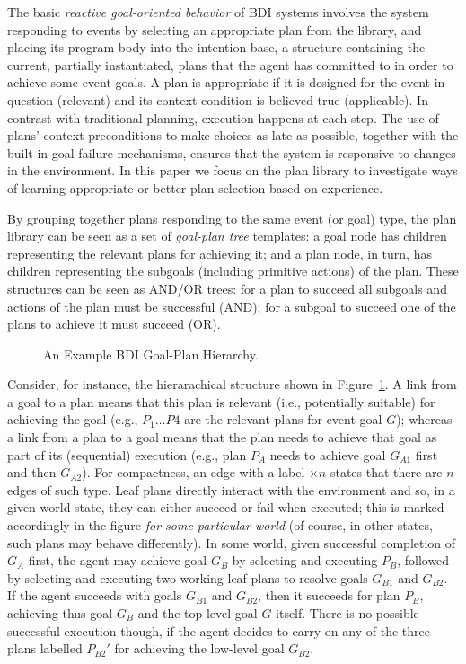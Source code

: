 The basic \emph{reactive goal-oriented behavior} of BDI systems involves the
system responding to events by selecting an appropriate plan from the library,
and placing its program body into the intention base, a structure containing the
current, partially instantiated, plans that the agent has committed to in order
to achieve some event-goals.
A plan is appropriate if it is designed for the event in question (relevant) and
its context condition is believed true (applicable).
In contrast with traditional planning, execution happens at each step. The use of
plans' context-preconditions to make choices as late as possible, together with
the built-in goal-failure mechanisms, ensures that the system is responsive to
changes in the environment.
In this paper we focus on the plan library to investigate ways of learning
appropriate or better plan selection based on experience.

By grouping together plans responding to the same
event (or goal) type, the plan library can be seen as a set of \emph{goal-plan tree}
templates: a goal node has children representing the
relevant plans for achieving it; and a plan node, in turn, has children
representing the subgoals (including primitive actions) of the plan.
These structures can be seen as AND/OR trees: for a plan to succeed all
subgoals and actions of the plan must be successful (AND); for a subgoal to
succeed one of the plans to achieve it must succeed (OR).

\begin{figure}[t]
\begin{center}
\resizebox{.6\textwidth}{!}{}
\end{center}
\vskip -0.5cm
\caption{An Example BDI Goal-Plan Hierarchy.}
\label{fig:T3}
\end{figure}

Consider, for instance, the hierarachical structure shown in Figure~\ref{fig:T3}.
A link from a goal to a plan means that this plan is relevant (i.e., potentially
suitable) for achieving the goal (e.g., $P_1 \ldots P4$ are the relevant plans
for event goal $G$); whereas a link from a plan to a goal means that the plan
needs to achieve that goal as part of its (sequential) execution (e.g., plan
$P_A$ needs to achieve goal $G_{A1}$ first and then $G_{A2}$).
For compactness, an edge with a label $\times n$ states that there are $n$ edges
of such type.
Leaf plans directly interact with the environment and so, in a given world state,
they can either succeed or fail when executed; this is marked accordingly in the
figure \emph{for some particular world} (of course, in other states, such plans
may behave differently).
In some world, given successful completion of $G_A$ first, the agent may achieve
goal $G_B$ by selecting and executing $P_B$, followed by selecting and executing two working leaf plans to resolve goals $G_{B1}$ and $G_{B2}$. If the agent
succeeds with goals $G_{B1}$ and $G_{B2}$, then it succeeds for plan $P_B$,
achieving thus goal $G_B$ and the top-level goal $G$ itself. There is no possible
successful execution though, if the agent decides to carry on any of the three
plans labelled $P_{B2}'$ for achieving the low-level goal $G_{B2}$.



